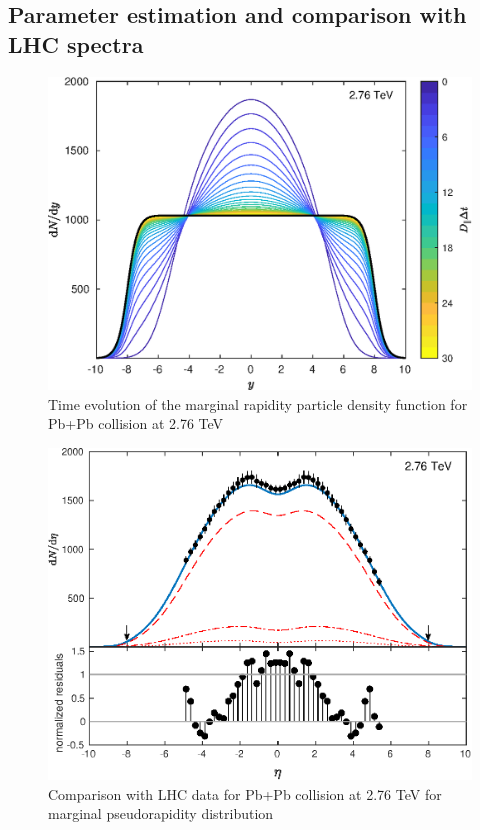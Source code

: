 \documentclass[a4paper,12pt]{book}
\begin{document}
\subsection{Parameter estimation and comparison with LHC spectra}
\begin{figure}
	\begin{center}
		\centering
		\includegraphics[width=\linewidth]{images/Pb_276_plot_y.eps}
		\caption{Time evolution of the marginal rapidity particle density function for Pb+Pb collision at 2.76 TeV}
		\label{fig:Pb_276_y}
	\end{center}
\end{figure}


\begin{figure}
	\begin{center}
		\centering
		\includegraphics[width=\linewidth]{images/Pb_276_plot_eta.eps}
		\caption{Comparison with LHC data for Pb+Pb collision at 2.76 TeV for marginal pseudorapidity distribution}
		\label{fig:Pb_276_eta}
	\end{center}
\end{figure}
\end{document}
